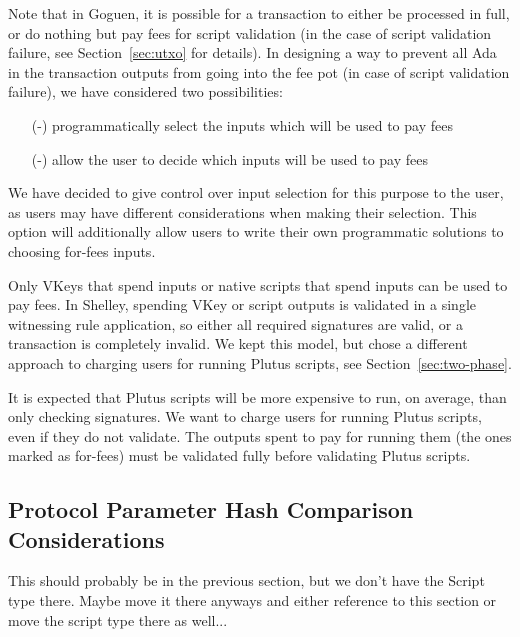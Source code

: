 Note that in Goguen, it is possible for a transaction
to either be processed in full, or do nothing but pay fees for script
validation (in the case of script validation failure, see Section~\ref{sec:utxo} for details).
In designing a way to prevent all Ada in the transaction outputs from going into
the fee pot (in case of script validation failure), we have considered two
possibilities:

\begin{itemize}
  \item[(-)] programmatically select the inputs which will be used to pay fees
  \item[(-)] allow the user to decide which inputs will be used to pay fees
\end{itemize}

We have decided to give control over input selection for this purpose to the user,
as users may have different considerations when making their selection. This
option will additionally allow users to write their own programmatic solutions
to choosing for-fees inputs.

Only VKeys that spend inputs or native scripts that spend inputs can
be used to pay fees. In Shelley, spending VKey or script outputs is
validated in a single witnessing rule application, so either all
required signatures are valid, or a transaction is completely
invalid. We kept this model, but chose a different approach to
charging users for running Plutus scripts, see
Section~\ref{sec:two-phase}.

It is expected that Plutus scripts will be more expensive to run, on
average, than only checking signatures. We want to charge users for
running Plutus scripts, even if they do not validate. The outputs
spent to pay for running them (the ones marked as for-fees) must be
validated fully before validating Plutus scripts.

\subsection{Protocol Parameter Hash Comparison Considerations}

\begin{note}
  This should probably be in the previous section, but we don't have
  the Script type there. Maybe move it there anyways and either
  reference to this section or move the script type there as well...
\end{note}

